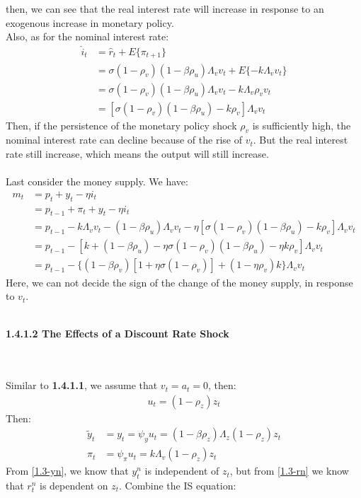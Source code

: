 \documentclass{article}
\numberwithin{equation}{section}
\begin{document}
then, we can see that the real interest rate will increase in response to an exogenous increase in monetary policy.\\
Also, as for the nominal interest rate:
	\begin{align*}
		\hat{i}_t &= \hat{r}_t + E\{\pi_{t+1}\}\\
		&= \sigma (1 - \rho_v)(1 - \beta\rho_u)\Lambda_v v_t + E\{-k\Lambda_v v_t\}\\
		&= \sigma (1 - \rho_v)(1 - \beta\rho_u)\Lambda_v v_t - k\Lambda_v \rho_v v_t\\
		&= [\sigma (1 - \rho_v)(1 - \beta\rho_u) - k\rho_v]\Lambda_v v_t
	\end{align*}
Then, if the persistence of the monetary policy shock $\rho_v$ is sufficiently high, the nominal interest rate can decline because of the rise of $v_t$. But the real interest rate still increase, which means the output will still increase.\\\\
Last consider the money supply. We have:
	\begin{align*}
		m_t &= p_t + y_t - \eta i_t\\
		&= p_{t-1} + \pi_t + y_t - \eta i_t\\
		&= p_{t-1} - k\Lambda_v v_t - (1 - \beta\rho_u)\Lambda_v v_t - \eta [\sigma (1 - \rho_v)(1 - \beta\rho_u) - k\rho_v]\Lambda_v v_t\\
		&= p_{t-1} - [k + (1 - \beta\rho_u) - \eta \sigma (1 - \rho_v)(1 - \beta\rho_u) - \eta k \rho_v]\Lambda_v v_t\\
		&= p_{t-1} - \{(1 - \beta\rho_v)[1 + \eta\sigma(1 - \rho_v)] + (1 - \eta\rho_v)k\}\Lambda_v v_t
	\end{align*}
Here, we can not decide the sign of the change of the money supply, in response to $v_t$.\\\\
\centerline{\textbf{1.4.1.2 The Effects of a Discount Rate Shock}}\\\\
Similar to \textbf{1.4.1.1}, we assume that $v_t = a_t = 0$, then:
	\begin{align*}
		u_t = (1 - \rho_z)z_t
	\end{align*}
Then:
	\begin{align*}
		\tilde{y}_t &= y_t = \psi_y u_t = (1 - \beta \rho_z)\Lambda_z (1 - \rho_z)z_t\\
		\pi_t &= \psi_\pi u_t = k\Lambda_v (1 - \rho_z)z_t
	\end{align*}
From \eqref{1.3-yn}, we know that $y^n_t$ is independent of $z_t$, but from \eqref{1.3-rn} we know that $r^n_t$ is dependent on $z_t$. Combine the IS equation:
\end{document}
